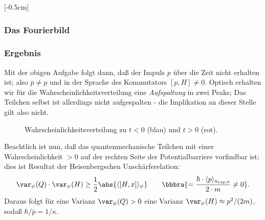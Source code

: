 \documentclass{subfiles}
\begin{document}
    [-0.5cm]
    \subsubsection*{Das Fourierbild}

    \subsubsection*{Ergebnis}
    Mit der obigen Aufgabe folgt dann, daß der Impuls $p$ über die Zeit nicht erhalten ist; also $\overline p\neq p$ und in der Sprache des Kommutators $[p,H]\neq 0$. Optisch erhalten wir für die Wahrscheinlichkeitsverteilung eine \emph{Aufspaltung} in zwei Peaks; Das Teilchen selbst ist allerdings nicht aufgespalten - die Implikation an dieser Stelle gilt also nicht. 
    \begin{figure}[H]
        \centering
        \caption{Wahrscheinlichkeitsverteilung zu $t<0$ (blau) und $t>0$ (rot).}
    \end{figure}
    Beachtlich ist nun, daß das quantenmechanische Teilchen mit einer Wahrscheinlichkeit $>0$ auf der rechten Seite der Potentialbarriere vorfindbar ist; dies ist Resultat der Heisenbergschen Unschärferelation:
    \[\var_\psi(Q)\cdot\var_\psi(H)\geq \frac{1}{2}\abs{\langle[H,x]\rangle_{\psi}}\qquad \bbbra{= \frac{\hbar\cdot\langle p\rangle_{u_{\exp,0}}}{2\cdot m}\neq 0}.\]
    Daraus folgt für eine Varianz $\var_\psi(Q)>0$ eine Varianz $\var_{\psi}(H) \approx p^2/(2m)$, sodaß $\hbar/\overline p = 1/\kappa$. 
    
\end{document}
